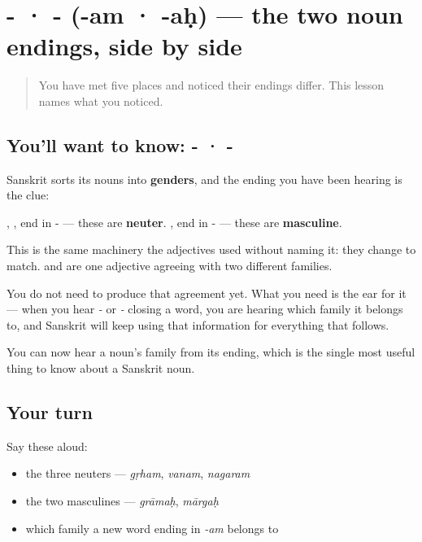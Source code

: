 \section[\texorpdfstring{-\sk{अम्} · -\sk{अः} (-am · -aḥ)}{-अम् · -अः (-am · -aḥ)}]{- · - (-am · -aḥ) — the two noun endings, side by side}

\label{lesson:SA-C16-noun-families}



\begin{quote}
You have met five places and noticed their endings differ. This lesson names what you noticed.
\end{quote}

\subsection*{You'll want to know: - · -}
Sanskrit sorts its nouns into \textbf{genders}, and the ending you have been hearing is the clue:

\emph{}, \emph{}, \emph{} end in - — these are \textbf{neuter}. \emph{}, \emph{} end in - — these are \textbf{masculine}.

This is the same machinery the adjectives used without naming it: they change to match. \emph{ } and \emph{ } are one adjective agreeing with two different families.

You do not need to produce that agreement yet. What you need is the ear for it — when you hear \emph{-} or \emph{-} closing a word, you are hearing which family it belongs to, and Sanskrit will keep using that information for everything that follows.

\begin{grammarlens}[title={What you've built}]
You can now hear a noun's family from its ending, which is the single most useful thing to know about a Sanskrit noun.
\end{grammarlens}

\subsection*{Your turn}
Say these aloud:

\begin{itemize}
\raggedright
  \item the three neuters — \emph{gṛham}, \emph{vanam}, \emph{nagaram}
  \item the two masculines — \emph{grāmaḥ}, \emph{mārgaḥ}
  \item which family a new word ending in \emph{-am} belongs to
\end{itemize}


